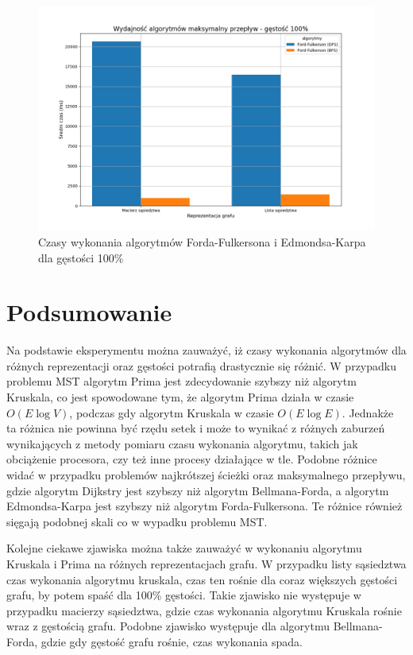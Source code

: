 \documentclass{article}
\begin{document}
\begin{figure}[H]
    \centering
    \includegraphics[scale=0.5]{../Python/charts_type2/Typ2_MAX_FLOW_gestosc100_wykres.png}
    \caption{Czasy wykonania algorytmów Forda-Fulkersona i Edmondsa-Karpa dla gęstości 100\%}
\end{figure}

\section{Podsumowanie}

Na podstawie eksperymentu można zauważyć, iż czasy wykonania algorytmów dla różnych reprezentacji oraz gęstości potrafią drastycznie się różnić.
W przypadku problemu MST algorytm Prima jest zdecydowanie szybszy niż algorytm Kruskala, co jest spowodowane tym, że algorytm Prima działa w czasie $O(E \log V)$, podczas gdy algorytm Kruskala w czasie $O(E \log E)$.
Jednakże ta różnica nie powinna być rzędu setek i może to wynikać z różnych zaburzeń wynikających z metody pomiaru czasu wykonania algorytmu, takich jak obciążenie procesora, czy też inne procesy działające w tle.
Podobne różnice widać w przypadku problemów najkrótszej ścieżki oraz maksymalnego przepływu, gdzie algorytm Dijkstry jest szybszy niż algorytm Bellmana-Forda, a algorytm Edmondsa-Karpa jest szybszy niż algorytm Forda-Fulkersona.
Te różnice również sięgają podobnej skali co w wypadku problemu MST. 

Kolejne ciekawe zjawiska można także zauważyć w wykonaniu algorytmu Kruskala i Prima na różnych reprezentacjach grafu.
W przypadku listy sąsiedztwa czas wykonania algorytmu kruskala, czas ten rośnie dla coraz większych gęstości grafu, by potem spaść dla 100\% gęstości.
Takie zjawisko nie występuje w przypadku macierzy sąsiedztwa, gdzie czas wykonania algorytmu Kruskala rośnie wraz z gęstością grafu. Podobne zjawisko występuje dla algorytmu
Bellmana-Forda, gdzie gdy gęstość grafu rośnie, czas wykonania spada.
\end{document}
